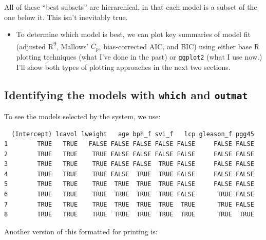 \documentclass[]{book}
\newenvironment{Shaded}{\begin{snugshade}}{\end{snugshade}}
\newcommand{\OperatorTok}[1]{\textcolor[rgb]{0.81,0.36,0.00}{\textbf{#1}}}
\newcommand{\NormalTok}[1]{#1}
\providecommand{\tightlist}{%
  \setlength{\itemsep}{0pt}\setlength{\parskip}{0pt}}
\theoremstyle{definition}
\theoremstyle{definition}
\theoremstyle{definition}
\theoremstyle{remark}
\begin{document}
All of these ``best subsets'' are hierarchical, in that each model is a
subset of the one below it. This isn't inevitably true.

\begin{itemize}
\tightlist
\item
  To determine which model is best, we can plot key summaries of model
  fit (adjusted R\textsuperscript{2}, Mallows' \(C_p\), bias-corrected
  AIC, and BIC) using either base R plotting techniques (what I've done
  in the past) or \texttt{ggplot2} (what I use now.) I'll show both
  types of plotting approaches in the next two sections.
\end{itemize}

\subsection{\texorpdfstring{Identifying the models with \texttt{which}
and
\texttt{outmat}}{Identifying the models with which and outmat}}\label{identifying-the-models-with-which-and-outmat}

To see the models selected by the system, we use:

\begin{Shaded}
\end{Shaded}

\begin{verbatim}
  (Intercept) lcavol lweight   age bph_f svi_f   lcp gleason_f pgg45
1        TRUE   TRUE   FALSE FALSE FALSE FALSE FALSE     FALSE FALSE
2        TRUE   TRUE    TRUE FALSE FALSE FALSE FALSE     FALSE FALSE
3        TRUE   TRUE    TRUE FALSE FALSE  TRUE FALSE     FALSE FALSE
4        TRUE   TRUE    TRUE FALSE  TRUE  TRUE FALSE     FALSE FALSE
5        TRUE   TRUE    TRUE  TRUE  TRUE  TRUE FALSE     FALSE FALSE
6        TRUE   TRUE    TRUE  TRUE  TRUE  TRUE FALSE      TRUE FALSE
7        TRUE   TRUE    TRUE  TRUE  TRUE  TRUE  TRUE      TRUE FALSE
8        TRUE   TRUE    TRUE  TRUE  TRUE  TRUE  TRUE      TRUE  TRUE
\end{verbatim}

Another version of this formatted for printing is:

\begin{Shaded}
\end{Shaded}
\end{document}
